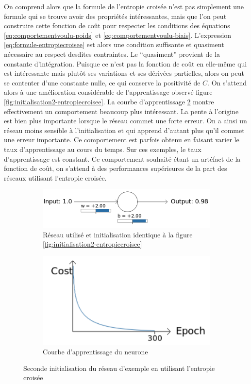On comprend alors que la formule de l'entropie croisée n'est pas simplement une formule qui se trouve avoir des propriétés intéressantes, mais que l'on peut
construire cette fonction de coût pour respecter les conditions des équations \ref{eq:comportementvoulu-poids} et \ref{eq:comportementvoulu-biais}. 
L'expression \ref{eq:formule-entropiecroisee} est alors une condition suffisante et quasiment nécessaire au respect desdites contraintes. 
Le ``quasiment'' provient de la constante d'intégration. Puisque ce n'est pas la fonction de coût en elle-même qui est intéressante mais plutôt
ses variations et ses dérivées partielles, alors on peut se contenter d'une constante nulle, ce qui conserve la positivité de $C$. On s'attend alors
à une amélioration considérable de l'apprentissage observé figure \ref{fig:initialisation2-entropiecroisee}. La courbe d'apprentissage
\ref{fig:initialisation3-entropiecroisee-courbe} montre effectivement un comportement beaucoup plus intéressant. La pente à l'origine est bien plus importante
lorsque le réseau commet une forte erreur. On a ainsi un réseau moins sensible à l'initialisation et qui apprend d'autant plus qu'il commet une
erreur importante. Ce comportement est parfois obtenu en faisant varier le taux d'apprentissage au cours du temps. Sur ces exemples, le taux d'apprentissage
est constant. Ce comportement souhaité étant un artéfact de la fonction de coût, on s'attend à des performances supérieures de la part des réseaux
utilisant l'entropie croisée.

\begin{figure}[h]
\centering
\begin{subfigure}{.5\textwidth}
  \centering
  \includegraphics[width=.6\linewidth]{img/entropiecroisee_reseau_utilise_init2.png}
  \caption{Réseau utilisé et initialisation identique à la figure \ref{fig:initialisation2-entropiecroisee}}
  \label{fig:initialisation3-entropiecroisee-schema}
\end{subfigure}%
\begin{subfigure}{.4\textwidth}
  \centering
  \includegraphics[width=.4\linewidth]{img/entropiecroisee_apprentissage3.png}
  \caption{Courbe d'apprentissage du neurone}
  \label{fig:initialisation3-entropiecroisee-courbe}
\end{subfigure}
\caption{Seconde initialisation du réseau d'exemple en utilisant l'entropie croisée}
\label{fig:initialisation3-entropiecroisee}
\end{figure}

